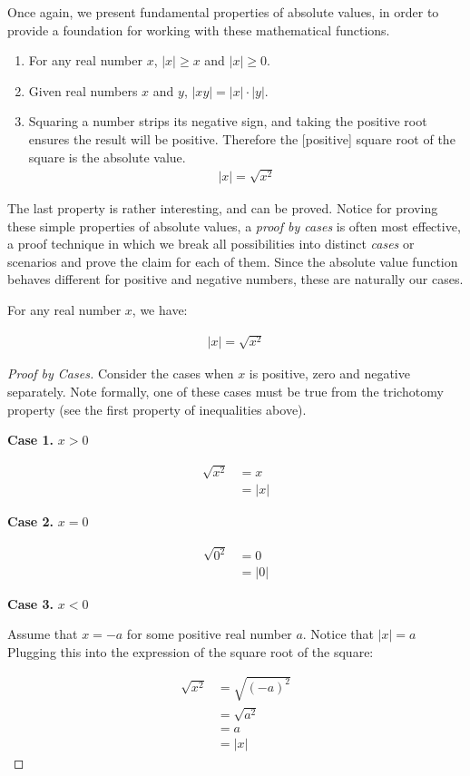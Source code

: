 \documentclass[twoside]{report}
\newcommand{\header}[2]{\begin{flushright} \textbf{#1} #2 \end{flushright}}
\begin{document}
Once again, we present fundamental properties of absolute values, in order to provide a foundation for working with these mathematical functions.

\begin{enumerate}
	\item For any real number $x$, $|x| \ge x$ and $|x| \ge 0$.
	\item Given real numbers $x$ and $y$, $|xy| = |x| \cdot |y|$.
	\item Squaring a number strips its negative sign, and taking the positive root ensures the result will be positive. Therefore the [positive] square root of the square is the absolute value.
	\begin{align*}
		|x| = \sqrt{x^2}
	\end{align*}
\end{enumerate}

The last property is rather interesting, and can be proved. Notice for proving these simple properties of absolute values, a \emph{proof by cases}  is often most effective, a proof technique in which we break all possibilities into distinct \emph{cases} or scenarios and prove the claim for each of them. Since the absolute value function behaves different for positive and negative numbers, these are naturally our cases.

\vspace{\baselineskip}
\begin{theorem}
	For any real number $x$, we have:
	
	\begin{align}
		|x| = \sqrt{x^2}
	\end{align}
\end{theorem}

\begin{proof}[Proof by Cases]
	Consider the cases when $x$ is positive, zero and negative separately. Note formally, one of these cases must be true from the trichotomy property (see the first property of inequalities above).
	
	\header{Case 1.}{$x > 0$}
	
	\begin{align*}
		\sqrt{x^2} &= x \\
		&= |x|
	\end{align*}
	
	\header{Case 2.}{$x = 0$}
	
	\begin{align*}
		\sqrt{0^2} &= 0 \\
		&= |0|
	\end{align*}
	
	\header{Case 3.}{$x < 0$}
	Assume that $x = -a$ for some positive real number $a$. Notice that $|x| = a$ Plugging this into the expression of the square root of the square:
	
	\begin{align*}
		\sqrt{x^2} &= \sqrt{(-a)^2} \\
		&= \sqrt{a^2} \\
		&= a \\
		&= |x|
	\end{align*}
\end{proof}
\end{document}
